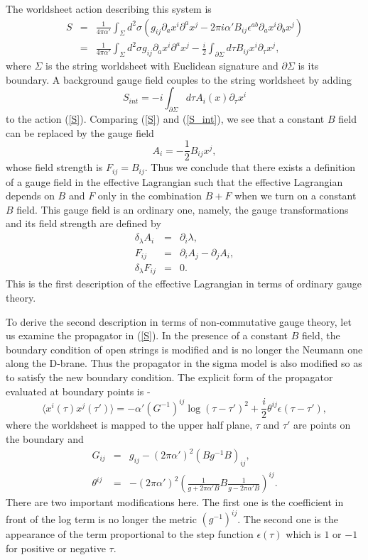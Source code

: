 \documentclass[a4paper,12pt]{article}
\begin{document}
The worldsheet action describing this system is
\begin{eqnarray}
S &=& \frac{1}{4 \pi \alpha'} \int_\Sigma d^2 \sigma
( g_{ij} \partial_a x^i \partial^a x^j
- 2 \pi i \alpha' B_{ij} \epsilon^{ab} \partial_a x^i \partial_b x^j )
\nonumber \\
&=& \frac{1}{4 \pi \alpha'} \int_\Sigma d^2 \sigma
g_{ij} \partial_a x^i \partial^a x^j
- \frac{i}{2} \int_{\partial \Sigma} d \tau
B_{ij} x^i \partial_\tau x^j,
\label{S}
\end{eqnarray}
where $\Sigma$ is the string worldsheet with Euclidean signature
and $\partial \Sigma$ is its boundary.
A background gauge field couples to the string worldsheet
by adding
\begin{equation}
S_{int} = -i \int_{\partial \Sigma} d \tau
A_i (x) \partial_\tau x^i
\label{S_int}
\end{equation}
to the action (\ref{S}).
Comparing (\ref{S}) and (\ref{S_int}),
we see that a constant $B$ field can be replaced by the gauge field
$$
A_i = -\frac{1}{2} B_{ij} x^j,
$$
whose field strength is $F_{ij} = B_{ij}$.
Thus we conclude that
there exists a definition of a gauge field in the effective Lagrangian
such that the effective Lagrangian depends on $B$ and $F$
only in the combination $B+F$ when we turn on a constant $B$ field.
This gauge field is an ordinary one, namely, the gauge transformations
and its field strength are defined by
\begin{eqnarray}
\delta_\lambda A_i &=& \partial_i \lambda, \\
F_{ij} &=& \partial_i A_j - \partial_j A_i, \\
\delta_\lambda F_{ij} &=& 0.
\end{eqnarray}
This is the first description of the effective Lagrangian
in terms of ordinary gauge theory.

To derive the second description in terms of
non-commutative gauge theory, let us examine
the propagator in (\ref{S}).
In the presence of a constant $B$ field,
the boundary condition of open strings is modified
and is no longer the Neumann one along the D-brane.
Thus the propagator in the sigma model is also modified
so as to satisfy the new boundary condition.
The explicit form of the propagator
evaluated at boundary points is \cite{FT}-\cite{ACNY}
\begin{equation}
\langle x^i (\tau) x^j (\tau') \rangle
= - \alpha' (G^{-1})^{ij} \log (\tau - \tau')^2
+ \frac{i}{2} \theta^{ij} \epsilon (\tau - \tau'),
\end{equation}
where the worldsheet is mapped to the upper half plane,
$\tau$ and $\tau'$ are points on the boundary and
\begin{eqnarray}
G_{ij} &=& g_{ij} - (2 \pi \alpha')^2 (B g^{-1} B)_{ij},
\\
\theta^{ij} &=&
- (2 \pi \alpha')^2 \left(
\frac{1}{g + 2 \pi \alpha' B} B \frac{1}{g - 2 \pi \alpha' B}
\right)^{ij}.
\end{eqnarray}
There are two important modifications here.
The first one is the coefficient in front of the log term
is no longer the metric $(g^{-1})^{ij}$.
The second one is the appearance of the term
proportional to the step function $\epsilon (\tau)$
which is $1$ or $-1$ for positive or negative $\tau$.
\end{document}
